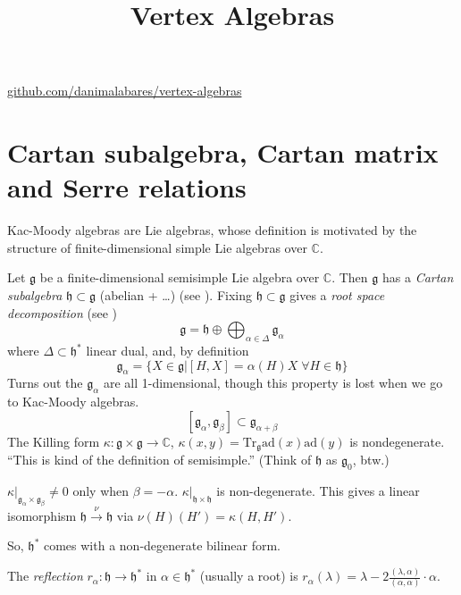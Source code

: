 



\title{Vertex Algebras}
\maketitle

\label{section-phantom}
\hfill
\href{http://github.com/danimalabares/vertex-algebras}
{github.com/danimalabares/vertex-algebras}

\tableofcontents

\section{Cartan subalgebra, Cartan matrix and Serre relations}
\label{section-Cartan-subalgebra}

Kac-Moody algebras are Lie algebras, whose definition is motivated by the
structure of finite-dimensional simple Lie algebras over $\mathbb{C}$.

Let $\mathfrak{g}$ be a finite-dimensional semisimple Lie algebra over
$\mathbb{C}$. Then $\mathfrak{g}$ has a {\it Cartan subalgebra} 
$\mathfrak{h}\subset \mathfrak{g}$ (abelian + …) 
(see \cite[Definition 8.2]{KLAL}). 
Fixing $\mathfrak{h}\subset\mathfrak{g}$ gives a 
{\it root space decomposition} (see \cite[Proposition 8.5]{KLAL})
$$
\mathfrak{g}=\mathfrak{h}\oplus \bigoplus_{\alpha \in \Delta}\mathfrak{g}_\alpha
$$
where $\Delta \subset \mathfrak{h}^*$ linear dual, and, by definition
$$
\mathfrak{g}_\alpha=\{X \in \mathfrak{g}|
[H,X]=\alpha(H)X\; \forall H \in \mathfrak{h}\}
$$
Turns out the $\mathfrak{g}_\alpha$ are all 1-dimensional, 
though this property is lost when we go to Kac-Moody algebras.
$$
[\mathfrak{g}_\alpha,\mathfrak{g}_\beta] \subset \mathfrak{g}_{\alpha+\beta}
$$
The Killing form  $\kappa:\mathfrak{g} \times \mathfrak{g} \to \mathbb{C}$,
 $\kappa(x,y)=\text{Tr}_\mathfrak{g}\text{ad}(x)\text{ad}(y)$ is nondegenerate. 
``This is kind of the definition of semisimple.'' 
(Think of $\mathfrak{h}$ as $\mathfrak{g}_0$, btw.)

$\kappa |_{\mathfrak{g}_\alpha \times \mathfrak{g}_\beta}\neq 0$ only when 
$\beta=-\alpha$. $\kappa |_{\mathfrak{h}\times \mathfrak{h}}$ is non-degenerate. 
 This gives a linear isomorphism 
$\mathfrak{h} \xrightarrow{\nu} \mathfrak{h}$ via 
$\nu(H)(H') = \kappa(H,H')$.

\medskip\noindent
So, $\mathfrak{h}^*$ comes with a non-degenerate bilinear form.

The {\it reflection} $r_\alpha:\mathfrak{h}\to \mathfrak{h}^*$ in 
$\alpha \in \mathfrak{h}^*$ (usually a root) is 
$r_\alpha(\lambda)=\lambda- 2\frac{(\lambda,\alpha)}{(\alpha,\alpha)}
\cdot \alpha.$

